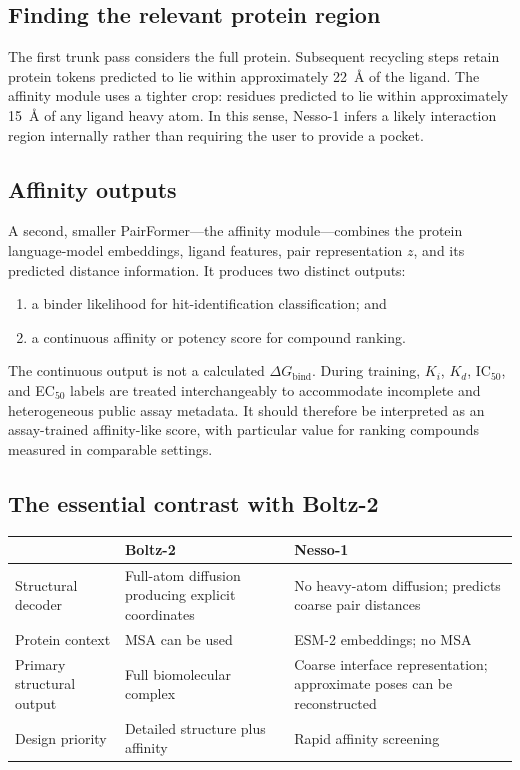 \subsection{Finding the relevant protein region}

The first trunk pass considers the full protein. Subsequent recycling steps
retain protein tokens predicted to lie within approximately 22~\AA{} of the
ligand. The affinity module uses a tighter crop: residues predicted to lie
within approximately 15~\AA{} of any ligand heavy atom. In this sense, Nesso-1
infers a likely interaction region internally rather than requiring the user to
provide a pocket.

\subsection{Affinity outputs}

A second, smaller PairFormer---the affinity module---combines the protein
language-model embeddings, ligand features, pair representation $z$, and its
predicted distance information. It produces two distinct outputs:

\begin{enumerate}
  \item a binder likelihood for hit-identification classification; and
  \item a continuous affinity or potency score for compound ranking.
\end{enumerate}

The continuous output is not a calculated $\Delta G_{\mathrm{bind}}$. During
training, $K_i$, $K_d$, IC$_{50}$, and EC$_{50}$ labels are treated
interchangeably to accommodate incomplete and heterogeneous public assay
metadata. It should therefore be interpreted as an assay-trained
affinity-like score, with particular value for ranking compounds measured in
comparable settings.

\subsection{The essential contrast with Boltz-2}

\begin{center}
\begin{tabular}{p{}p{}p{}}
\toprule
 & \textbf{Boltz-2} & \textbf{Nesso-1} \\
\midrule
Structural decoder & Full-atom diffusion producing explicit coordinates & No
heavy-atom diffusion; predicts coarse pair distances \\
Protein context & MSA can be used & ESM-2 embeddings; no MSA \\
Primary structural output & Full biomolecular complex & Coarse interface
representation; approximate poses can be reconstructed \\
Design priority & Detailed structure plus affinity & Rapid affinity screening \\
\bottomrule
\end{tabular}
\end{center}

